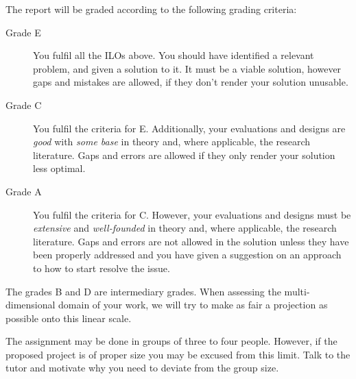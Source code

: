 The report will be graded according to the following grading criteria:
\begin{description}
  \item[Grade E] You fulfil all the \acp{ILO} above.
    You should have identified a relevant problem, and given a solution to it.
    It must be a viable solution, however gaps and mistakes are allowed, if 
    they don't render your solution unusable.

  \item[Grade C] You fulfil the criteria for E.
    Additionally, your evaluations and designs are \emph{good} with \emph{some 
      base} in theory and, where applicable, the research literature.
    Gaps and errors are allowed if they only render your solution less optimal.

  \item[Grade A] You fulfil the criteria for C.
    However, your evaluations and designs must be \emph{extensive} and 
    \emph{well-founded} in theory and, where applicable, the research 
    literature.
    Gaps and errors are not allowed in the solution unless they have been 
    properly addressed and you have given a suggestion on an approach to how to 
    start resolve the issue.
\end{description}
The grades B and D are intermediary grades.
When assessing the multi-dimensional domain of your work, we will try to make 
as fair a projection as possible onto this linear scale.

The assignment may be done in groups of three to four people.
However, if the proposed project is of proper size you may be excused from this 
limit.
Talk to the tutor and motivate why you need to deviate from the group size.


\printbibliography
